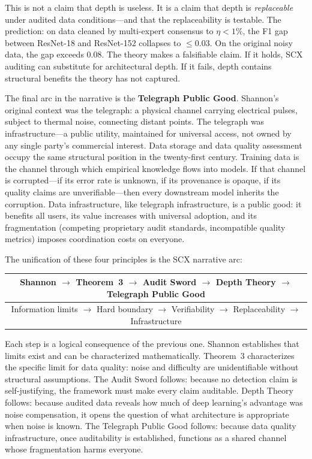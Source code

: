 \documentclass[11pt,a4paper]{article}
\theoremstyle{definition}
\begin{document}
This is not a claim that depth is useless. It is a claim that depth is \textit{replaceable} under audited data conditions---and that the replaceability is testable. The prediction: on data cleaned by multi-expert consensus to $\eta < 1\%$, the F1 gap between ResNet-18 and ResNet-152 collapses to $\leq 0.03$. On the original noisy data, the gap exceeds $0.08$. The theory makes a falsifiable claim. If it holds, SCX auditing can substitute for architectural depth. If it fails, depth contains structural benefits the theory has not captured.

The final arc in the narrative is the \textbf{Telegraph Public Good}. Shannon's original context was the telegraph: a physical channel carrying electrical pulses, subject to thermal noise, connecting distant points. The telegraph was infrastructure---a public utility, maintained for universal access, not owned by any single party's commercial interest. Data storage and data quality assessment occupy the same structural position in the twenty-first century. Training data is the channel through which empirical knowledge flows into models. If that channel is corrupted---if its error rate is unknown, if its provenance is opaque, if its quality claims are unverifiable---then every downstream model inherits the corruption. Data infrastructure, like telegraph infrastructure, is a public good: it benefits all users, its value increases with universal adoption, and its fragmentation (competing proprietary audit standards, incompatible quality metrics) imposes coordination costs on everyone.

The unification of these four principles is the SCX narrative arc:

\vspace{0.5em}

\begin{center}
\begin{tabular}{c}
\toprule
\textbf{Shannon} $\rightarrow$ \textbf{Theorem~3} $\rightarrow$ \textbf{Audit Sword} $\rightarrow$ \textbf{Depth Theory} $\rightarrow$ \textbf{Telegraph Public Good} \\
\midrule
Information limits $\rightarrow$ Hard boundary $\rightarrow$ Verifiability $\rightarrow$ Replaceability $\rightarrow$ Infrastructure \\
\bottomrule
\end{tabular}
\end{center}

\vspace{0.5em}

Each step is a logical consequence of the previous one. Shannon establishes that limits exist and can be characterized mathematically. Theorem~3 characterizes the specific limit for data quality: noise and difficulty are unidentifiable without structural assumptions. The Audit Sword follows: because no detection claim is self-justifying, the framework must make every claim auditable. Depth Theory follows: because audited data reveals how much of deep learning's advantage was noise compensation, it opens the question of what architecture is appropriate when noise is known. The Telegraph Public Good follows: because data quality infrastructure, once auditability is established, functions as a shared channel whose fragmentation harms everyone.
\end{document}
